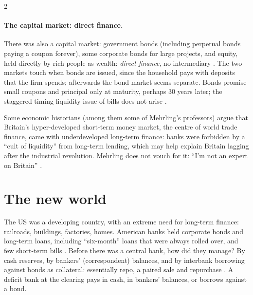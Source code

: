 \begin{paracol}{2}
\paragraph{The capital market: direct finance.} There was also a capital market: government bonds (including perpetual bonds paying a coupon forever), some
corporate bonds for large projects, and equity, held directly by rich people as wealth: \emph{direct finance}, no intermediary
. The two markets touch when bonds are issued, since the household pays with deposits that the firm
spends; afterwards the bond market seems separate. Bonds promise small coupons and principal only at maturity, perhaps 30 years later; the staggered-timing
liquidity issue of bills does not arise .

\begin{nfigure}
\begin{taccts}
\quad
{}\quad
{}
\end{taccts}
\caption{Bagehot's world: indirect finance in the money market, direct finance in the capital market .}\label{fig:di-bagehot}
\end{nfigure}

\begin{aside}
Some economic historians (among them some of Mehrling's professors) argue that Britain's hyper-developed short-term money market, the centre of world trade
finance, came with underdeveloped long-term finance: banks were forbidden by a ``cult of liquidity'' from long-term lending, which may help explain Britain
lagging after the industrial revolution. Mehrling does not vouch for it: ``I'm not an expert on Britain'' .
\end{aside}

\section{The new world}\label{sec:di-newworld}

The US was a developing country, with an extreme need for long-term finance: railroads, buildings, factories, homes. American banks held corporate bonds and
long-term loans, including ``six-month'' loans that were always rolled over, and few short-term bills .
Before there was a central bank, how did they manage? By cash reserves, by bankers' (correspondent) balances, and by interbank borrowing against bonds as
collateral: essentially repo, a paired sale and repurchase . A deficit bank
at the clearing pays in cash, in bankers' balances, or borrows against a bond.


\end{paracol}
